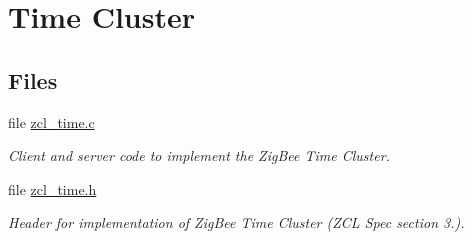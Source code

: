 \hypertarget{group__zcl__time}{}\section{Time Cluster}
\label{group__zcl__time}
\subsection*{Files}
\begin{DoxyCompactItemize}
\item 
file \hyperlink{zcl__time_8c}{zcl\+\_\+time.\+c}
\begin{DoxyCompactList}\small\item\em Client and server code to implement the Zig\+Bee Time Cluster. \end{DoxyCompactList}\item 
file \hyperlink{zcl__time_8h}{zcl\+\_\+time.\+h}
\begin{DoxyCompactList}\small\item\em Header for implementation of Zig\+Bee Time Cluster (Z\+CL Spec section 3.). \end{DoxyCompactList}\end{DoxyCompactItemize}
